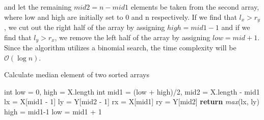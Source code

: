     	and let the remaining $ mid2 = n-mid1$ elements be taken from the second array, where low and high are initially set to 0 and n respectively. 
    	If we find that $l_x > r_y$, we cut out the right half of the array by assigning $high = mid1 - 1$ and if we find that $l_y > r_x$, we remove the left half of the array by assigning $low = mid + 1$. 
    	Since the algorithm utilizes a binomial search, the time complexity will be $\mathcal{O}(\log{}n)$.
    	\begin{algorithm}[H]
    		\caption{Calculate median element of two sorted arrays}
    		\begin{algorithmic}[1]
    			\State int low = 0, high = X.length
	    			\State int mid1 = (low + high)/2, \quad mid2 = X.length - mid1
	    			\State lx = X[mid1 - 1]
	    			\State ly = Y[mid2 - 1]
	    			\State rx = X[mid1]
	    			\State ry = Y[mid2]
	    				\State \textbf{return} \textit{max}(lx, ly)
	    					\State high = mid1-1
	    					\State low = mid1 + 1
	    			\EndIf
    			\EndWhile
    			\EndProcedure
    			
    		\end{algorithmic}
    	\end{algorithm}
